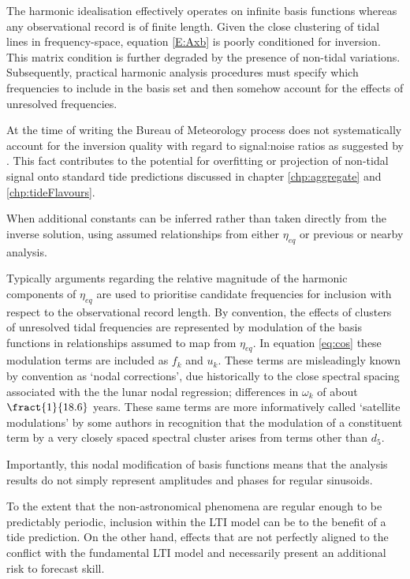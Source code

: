 The harmonic idealisation effectively operates on infinite basis functions whereas any observational record is of finite length.
Given the close clustering of tidal lines in frequency-space, equation \ref{E:Axb} is poorly conditioned for inversion.   This matrix condition is further degraded by the presence of non-tidal variations. 
Subsequently, practical harmonic analysis procedures must specify which frequencies to include in the basis set and then somehow account for the effects of unresolved frequencies.

At the time of writing the Bureau of Meteorology process does not systematically account for the inversion quality with regard to signal:noise ratios as suggested by \citet{Foreman:2009bg}.
This fact contributes to the potential for overfitting or projection of non-tidal signal onto standard tide predictions discussed in chapter \ref{chp:aggregate} and \ref{chp:tideFlavours}.


When additional constants can be inferred rather than taken directly from the inverse solution, using assumed relationships from either $\eta_{eq}$ or previous or nearby analysis.




Typically arguments regarding the relative magnitude of the harmonic components of $\eta_{eq}$ are used to prioritise candidate frequencies for inclusion with respect to the observational  record length. 
By convention, the effects of clusters of unresolved tidal frequencies are represented by modulation of the basis functions in relationships assumed to map from $\eta_{eq}$.  
In equation \ref{eq:cos} these modulation terms are included as $f_k$ and $u_k$.  These terms are misleadingly known by convention as `nodal corrections', due historically to the close spectral spacing associated with the the lunar nodal regression; differences in $\omega_k$ of about $\fract{1}{18.6}$ years.     These same terms are more informatively called `satellite modulations' by some authors in recognition that the modulation of a constituent term by a very closely spaced spectral cluster arises from terms other than $d_5$. 

Importantly, this nodal modification of basis functions means that the analysis results do not simply represent amplitudes and phases for regular sinusoids.  





To the extent that the non-astronomical phenomena are regular enough to be predictably periodic, inclusion within the LTI model can be to the benefit of a tide prediction.   On the other hand, effects that are not perfectly aligned to the \ATGF{} conflict with the fundamental LTI model and necessarily present an additional risk to forecast skill.


